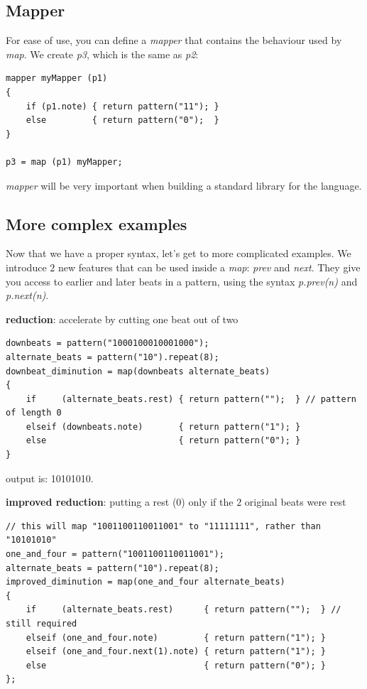 \documentclass[11pt,twoside]{article}
\begin{document}
\subsection{Mapper}
For ease of use, you can define a \textit{mapper} that contains the behaviour
used by \textit{map}. We create \textit{p3}, which is the same as
\textit{p2}:
\begin{verbatim}
mapper myMapper (p1)
{
    if (p1.note) { return pattern("11"); }
    else         { return pattern("0");  }
}

p3 = map (p1) myMapper;
\end{verbatim}
\textit{mapper} will be very important when building a standard library
for the language.

\subsection{More complex examples}
Now that we have a proper syntax, let's get to more complicated examples.
We introduce $2$ new features that can be used inside a \textit{map}:
\textit{prev} and \textit{next}. They give you access to earlier
and later beats in a pattern, using the syntax \textit{p.prev(n)} and
\textit{p.next(n)}. 

\textbf{reduction}: accelerate by cutting one beat out of two
\begin{verbatim}
downbeats = pattern("1000100010001000");
alternate_beats = pattern("10").repeat(8);
downbeat_diminution = map(downbeats alternate_beats)
{
    if     (alternate_beats.rest) { return pattern("");  } // pattern of length 0
    elseif (downbeats.note)       { return pattern("1"); }
    else                          { return pattern("0"); }
}
\end{verbatim}
output is: 10101010.

\textbf{improved reduction}: putting a rest (0) only if the $2$ original beats were rest
\begin{verbatim}
// this will map "1001100110011001" to "11111111", rather than "10101010"
one_and_four = pattern("1001100110011001");
alternate_beats = pattern("10").repeat(8);
improved_diminution = map(one_and_four alternate_beats)
{
    if     (alternate_beats.rest)      { return pattern("");  } // still required
    elseif (one_and_four.note)         { return pattern("1"); }
    elseif (one_and_four.next(1).note) { return pattern("1"); }
    else                               { return pattern("0"); }
};
\end{verbatim}
\end{document}
